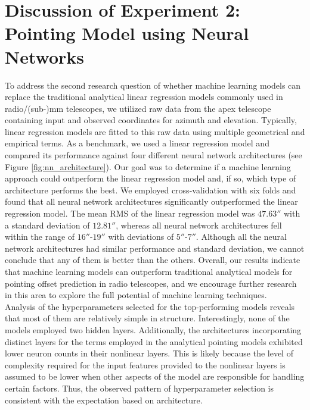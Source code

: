 \section{Discussion of Experiment 2: Pointing Model using Neural Networks}

To address the second research question of whether machine learning models can replace the traditional analytical linear regression models commonly used in radio/(sub-)mm telescopes,
we utilized raw data from the apex telescope containing input and observed coordinates for azimuth and elevation.
Typically, linear regression models are fitted to this raw data using multiple geometrical and empirical terms.
As a benchmark, we used a linear regression model and compared its performance against four different neural network architectures (see Figure \ref{fig:nn_architecture}).
Our goal was to determine if a machine learning approach could outperform the linear regression model and, if so, which type of architecture performs the best.
We employed cross-validation with six folds and found that all neural network architectures significantly outperformed the linear regression model.
The mean RMS of the linear regression model was $47.63''$ with a standard deviation of $12.81''$, whereas all neural network architectures fell within the range of $16''$-$19''$ with deviations of $5''$-$7''$.
Although all the neural network architectures had similar performance and standard deviation, we cannot conclude that any of them is better than the others.
Overall, our results indicate that machine learning models can outperform traditional analytical models for pointing offset prediction in radio telescopes,
and we encourage further research in this area to explore the full potential of machine learning techniques.\\

Analysis of the hyperparameters selected for the top-performing models reveals that most of them are relatively simple in structure.
Interestingly, none of the models employed two hidden layers.
Additionally, the architectures incorporating distinct layers for the terms employed in the analytical pointing models exhibited lower neuron counts in their nonlinear layers.
This is likely because the level of complexity required for the input features provided to the nonlinear layers is assumed to be lower when other aspects of the model are responsible for handling certain factors.
Thus, the observed pattern of hyperparameter selection is consistent with the expectation based on architecture.\\


